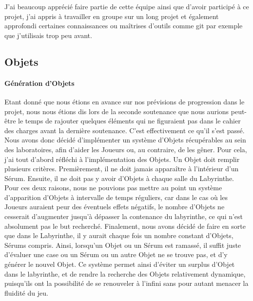 \documentclass{article}
\begin{document}
J'ai beaucoup apprécié faire partie de cette équipe ainsi que d'avoir participé à ce projet, j'ai appris à travailler en groupe sur un long projet et également approfondi certaines connaissances ou maîtrises d'outils comme git par exemple que j'utilisais trop peu avant.































\newpage
\subsection{Objets}
\paragraph{Génération d'Objets}
Etant donné que nous étions en avance sur nos prévisions de progression dans le projet, nous nous étions dis lors de la seconde soutenance que nous aurions peut-être le temps de rajouter quelques éléments qui ne figuraient pas dans le cahier des charges avant la dernière soutenance. C'est effectivement ce qu'il s'est passé. Nous avons donc décidé d'implémenter un système d'Objets récupérables au sein des laboratoires, afin d'aider les Joueurs ou, au contraire, de les gêner. Pour cela, j'ai tout d'abord réfléchi à l'implémentation des Objets. Un Objet doit remplir plusieurs critères. Premièrement, il ne doit jamais apparaître à l'intérieur d'un Sérum. Ensuite, il ne doit pas y avoir d'Objets à chaque salle du Labyrinthe. Pour ces deux raisons, nous ne pouvions pas mettre au point un système d'apparition d'Objets à intervalle de temps réguliers, car dans le cas où les Joueurs auraient peur des éventuels effets négatifs, le nombre d'Objets ne cesserait d'augmenter jusqu'à dépasser la contenance du labyrinthe, ce qui n'est absolument pas le but recherché. Finalement, nous avons décidé de faire en sorte que dans le Labyrinthe, il y aurait chaque fois un nombre constant d'Objets, Sérums compris. Ainsi, lorsqu'un Objet ou un Sérum est ramassé, il suffit juste d'évaluer une case ou un Sérum ou un autre Objet ne se trouve pas, et d'y générer le nouvel Objet. Ce système permet ainsi d'éviter un surplus d'Objet dans le labyrinthe, et de rendre la recherche des Objets relativement dynamique, puisqu'ils ont la possibilité de se renouveler à l'infini sans pour autant menacer la fluidité du jeu. 
\end{document}
